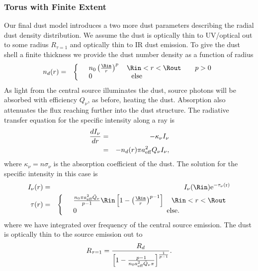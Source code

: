 \subsubsection{Torus with Finite Extent}
\label{S:ThickTor}
Our final dust model introduces a two more dust parameters describing the radial dust density distribution. We assume the dust is optically thin
to UV/optical out to some radius $R_{\tau=1}$ and optically thin to IR
dust emission.  To give the dust shell a finite thickness we provide the dust
number density as a function of radius
\begin{eqnarray}
n_d(r)
&=& 
\left\{
        \begin{array}{l l}
              &n_0 \left(\frac{\Rin}{r}\right)^{p}  \quad  \Rin < r < \Rout    \qquad p>0 \\
              &0   \qquad \qquad \quad \ \  \mbox{else} %
        \end{array}
\right.
\label{Eq:nd}
\end{eqnarray}
As light from the central source illuminates the dust, source photons will be
absorbed with efficiency $Q_{\nu}$, as before, heating the dust. Absorption
also attenuates the flux reaching further into the dust structure. The
radiative transfer equation for the specific intensity along a ray is
\begin{eqnarray}
\frac{d I_{\nu}}{dr} &=& -\kappa_{\nu}I_{\nu}  \nonumber \\
 &=& -  n_d(r) \pi a^2_{\rm eff} {Q}_{\nu} I_{\nu},
\end{eqnarray}
where $\kappa_{\nu} = n \sigma_{\nu}$ is the absorption coefficient of the dust. The solution for the specific intensity in this case is
\begin{eqnarray}
I_{\nu}(r) &=& I_{\nu}(\Rin)  \rm{e}^{ -\tau_{\nu}(r)} \\ \nonumber
\tau(r)  &=&  
\left\{
        \begin{array}{ll}
              & \frac{ n_0 \pi a^2_{\rm eff} \bar{Q}_{\nu}}{p - 1} \Rin \left[ 1 - \left( \frac{\Rin}{r}\right)^{p-1} \right]   \quad \Rin < r < \Rout    \\
              &0   \qquad \qquad \qquad \qquad \qquad  \qquad \quad  \mbox{else}.%
        \end{array}
\right.
\label{Eq:tauIn}
\end{eqnarray}
where we have integrated over frequency of the central source emission. The
dust is optically thin to the source emission out to
\begin{equation}
\label{Eq:Rtau1}
R_{\tau=1} = \frac{R_d} {\left[ 1 - \frac{p-1}{n_0 a^2_{\rm eff} \bar{Q}_{\nu} \pi }  \right]^{\frac{1}{p-1}}}.
\end{equation}
